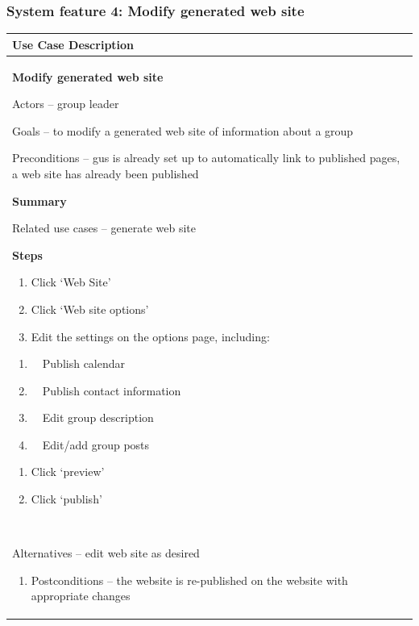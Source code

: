 \documentclass[letterpaper]{article}
\newcommand\liststyleLii{%
\renewcommand\theenumi{\arabic{enumi}}
\renewcommand\theenumii{\alph{enumii}}
\renewcommand\theenumiii{\roman{enumiii}}
\renewcommand\theenumiv{\arabic{enumiv}}
\renewcommand\labelenumi{\theenumi.}
\renewcommand\labelenumii{\theenumii.}
\renewcommand\labelenumiii{\theenumiii.}
\renewcommand\labelenumiv{\theenumiv.}
}
\newcommand\liststyleLvi{%
\renewcommand\theenumi{\arabic{enumi}}
\renewcommand\theenumii{\alph{enumii}}
\renewcommand\theenumiii{\roman{enumiii}}
\renewcommand\theenumiv{\arabic{enumiv}}
\renewcommand\labelenumi{\theenumi.}
\renewcommand\labelenumii{\theenumii.}
\renewcommand\labelenumiii{\theenumiii.}
\renewcommand\labelenumiv{\theenumiv.}
}
\newcommand\liststyleLvii{%
\renewcommand\theenumi{\alph{enumi}}
\renewcommand\theenumii{\alph{enumii}}
\renewcommand\theenumiii{\roman{enumiii}}
\renewcommand\theenumiv{\arabic{enumiv}}
\renewcommand\labelenumi{\theenumi.}
\renewcommand\labelenumii{\theenumii.}
\renewcommand\labelenumiii{\theenumiii.}
\renewcommand\labelenumiv{\theenumiv.}
}
\begin{document}
\bigskip

\subsubsection[System feature 4: Modify generated web site]{\rmfamily
System feature 4: Modify generated web site}
\begin{flushleft}
\tablehead{}
\begin{supertabular}{|m{6.42126in}|}
\hline
\bfseries\color{black} Use Case Description\\\hline
{\bfseries\color{black} Modify generated web site}

{\color{black} Actors -- group leader}

{\color{black} Goals -- to modify a generated web site of information
about a group}

{\color{black} Preconditions -- gus is already set up to automatically
link to published pages, a web site has already been published}

{\bfseries\color{black} Summary}

{\color{black} Related use cases -- generate web site}

{\bfseries\color{black} Steps}

\liststyleLvi
\begin{enumerate}
\item \color{black} Click {\textquoteleft}Web Site{\textquoteright}\item
\color{black} Click {\textquoteleft}Web site
options{\textquoteright}\item \color{black} Edit the settings on the
options page, including:\end{enumerate}
\liststyleLvii
\begin{enumerate}
\item \color{black} \ \ Publish calendar\item \color{black} \ \ Publish
contact information\item \color{black} \ \ Edit group description\item
\color{black} \ \ Edit/add group posts\end{enumerate}
\liststyleLvi
\begin{enumerate}
\item \color{black} Click {\textquoteleft}preview{\textquoteright}\item
\color{black} Click
{\textquoteleft}publish{\textquoteright}\end{enumerate}
~

{\color{black} Alternatives -- edit web site as desired}

\liststyleLii
\begin{enumerate}
\item \color{black} Postconditions -- the website is re-published on the
website with appropriate changes\end{enumerate}
\\\hline
\end{supertabular}
\end{flushleft}
\end{document}
